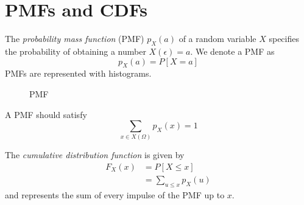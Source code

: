 \section{PMFs and CDFs}

The \emph{probability mass function} (PMF) $p_X(a)$
of a random variable $X$ specifies the probability of
obtaining a number $X(\epsilon) = a$. We denote a PMF as
\begin{equation}
    p_X(a) = P[X = a]
\end{equation}
PMFs are represented with histograms.
\begin{figure}[h]
    \centering
    \caption{PMF}
\end{figure}
A PMF should satisfy
\begin{equation}
    \sum_{x\in X(\Omega)} p_X(x) = 1
\end{equation}

The \emph{cumulative distribution function} is given by
\begin{align}
    F_X(x) & = P\left[X \leq x\right] \\
           & = \sum_{u \leq x} p_X(u)
\end{align}
and represents the sum of every impulse
of the PMF up to $x$.